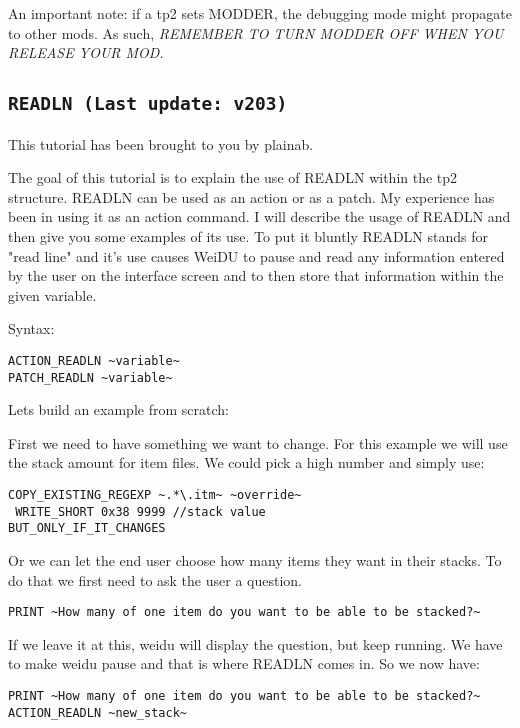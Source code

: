 \documentclass{article}
\begin{document}
An important note: if a tp2 sets MODDER, the debugging mode might propagate to
other mods. As such, \emph{REMEMBER TO TURN MODDER OFF WHEN YOU RELEASE YOUR MOD.}

\label{sec-readln}\subsection{\tt{READLN} (Last update: v203)}

This tutorial has been brought to you by plainab.

The goal of this tutorial is to explain the use of READLN within the tp2 structure.
READLN can be used as an action or as a patch.  My experience has been in using it
as an action command. I will describe the usage of READLN and then give you some
examples of its use.  To put it bluntly READLN stands for "read line" and it's use
causes WeiDU to pause and read any information entered by the user on the interface
screen and to then store that information within the given variable.

Syntax:
\begin{verbatim}
ACTION_READLN ~variable~
PATCH_READLN ~variable~
\end{verbatim}

Lets build an example from scratch:

First we need to have something we want to change.  For this example we will use the
stack amount for item files.  We could pick a high number and simply use:

\begin{verbatim}
COPY_EXISTING_REGEXP ~.*\.itm~ ~override~
 WRITE_SHORT 0x38 9999 //stack value
BUT_ONLY_IF_IT_CHANGES
\end{verbatim}

Or we can let the end user choose how many items they want in their stacks.
To do that we first need to ask the user a question.

\begin{verbatim}
PRINT ~How many of one item do you want to be able to be stacked?~
\end{verbatim}

If we leave it at this, weidu will display the question, but keep running.
We have to make weidu pause and that is where READLN comes in. So we now have:

\begin{verbatim}
PRINT ~How many of one item do you want to be able to be stacked?~
ACTION_READLN ~new_stack~
\end{verbatim}
\end{document}
